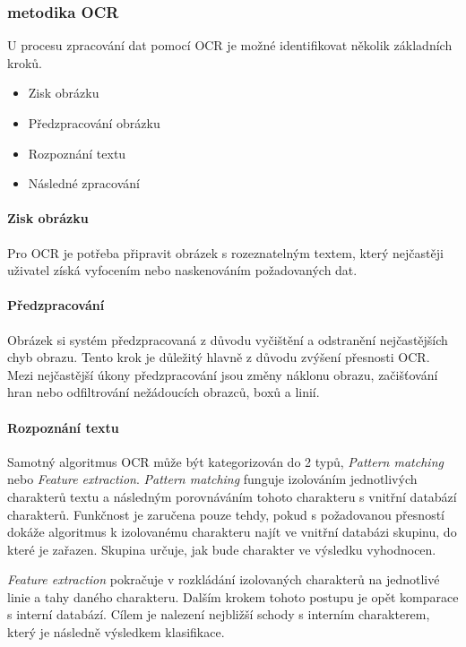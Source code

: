 \documentclass[journal]{IEEEtran}
\begin{document}
\subsubsection{metodika OCR}
U procesu zpracování dat pomocí \ac{OCR} je možné identifikovat několik základních kroků.\cite{amazon_ocr}

\begin{itemize}
 \item Zisk obrázku
 \item Předzpracování obrázku
 \item Rozpoznání textu
 \item Následné zpracování
\end{itemize}

\paragraph{Zisk obrázku}
Pro \ac{OCR} je potřeba připravit obrázek s rozeznatelným textem, který nejčastěji uživatel získá vyfocením nebo naskenováním požadovaných dat.

\paragraph{Předzpracování}
Obrázek si systém předzpracovaná z důvodu vyčištění a odstranění nejčastějších chyb obrazu.
Tento krok je důležitý hlavně z důvodu zvýšení přesnosti \ac{OCR}.
Mezi nejčastější úkony předzpracování jsou změny náklonu obrazu, začišťování hran nebo odfiltrování nežádoucích obrazců, boxů a linií.

\paragraph{Rozpoznání textu}
Samotný algoritmus \ac{OCR} může být kategorizován do 2 typů, \textit {Pattern matching} nebo \textit{Feature extraction}.
\textit{Pattern matching} funguje izolováním jednotlivých charakterů textu a následným porovnáváním tohoto charakteru s vnitřní databází charakterů.
Funkčnost je zaručena pouze tehdy, pokud s požadovanou přesností dokáže algoritmus k izolovanému charakteru najít ve vnitřní databázi skupinu, do které je zařazen.
Skupina určuje, jak bude charakter ve výsledku vyhodnocen.

\textit{Feature extraction} pokračuje v rozkládání izolovaných charakterů na jednotlivé linie a tahy daného charakteru.
Dalším krokem tohoto postupu je opět komparace s interní databází.
Cílem je nalezení nejbližší schody s interním charakterem, který je následně výsledkem klasifikace.
\end{document}
